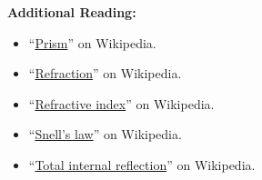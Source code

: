 {\bf Additional Reading:}
\begin{itemize}
\item ``\href{https://en.wikipedia.org/wiki/Prism}{Prism}'' on Wikipedia.
\item ``\href{https://en.wikipedia.org/wiki/Refraction}{Refraction}'' on Wikipedia.
\item ``\href{https://en.wikipedia.org/wiki/Refractive_index}{Refractive index}'' on Wikipedia.
\item ``\href{https://en.wikipedia.org/wiki/Snell's_law}{Snell's law}'' on Wikipedia.
\item ``\href{https://en.wikipedia.org/wiki/Total_internal_reflection}{Total internal reflection}'' on Wikipedia.
\end{itemize}



